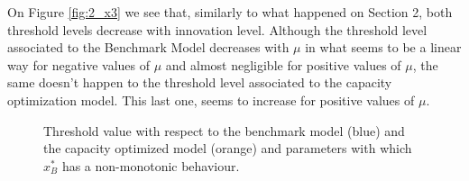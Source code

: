 On Figure \ref{fig:2_x3} we see that, similarly to what happened on Section 2, both threshold levels decrease with innovation level. Although the threshold level associated to the Benchmark Model decreases with $\mu$ in what seems to be a linear way for negative values of $\mu$ and almost negligible for positive values of $\mu$, the same doesn't happen to the threshold level associated to the capacity optimization model. This last one, seems to increase for positive values of $\mu$. 


\begin{figure}[!htb]
	\begin{subfigmatrix}{3}
	\end{subfigmatrix}
	\caption{Threshold value with respect to the benchmark model (blue) and the capacity optimized model (orange) and parameters with which  $x^*_B$ has a non-monotonic behaviour.}
	\label{fig:2_x1}
\end{figure}

